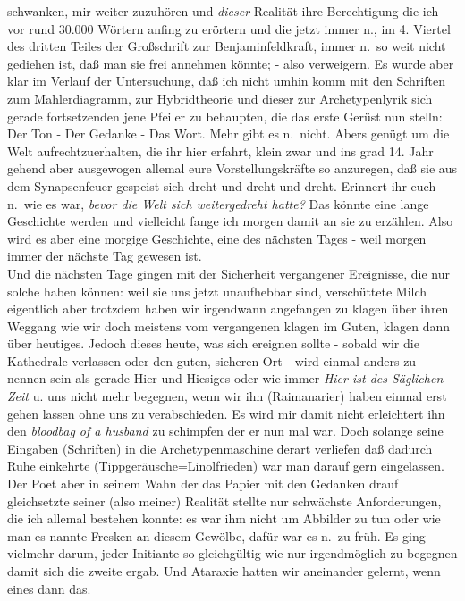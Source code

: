 \documentclass[
]{article}
\begin{document}
schwanken, mir weiter zuzuhören und \emph{dieser} Realität ihre
Berechtigung die ich vor rund 30.000 Wörtern anfing zu erörtern und die
jetzt immer n., im 4. Viertel des dritten Teiles der Großschrift zur
Benjaminfeldkraft, immer n.~so weit nicht gediehen ist, daß man sie frei
annehmen könnte; - also verweigern. Es wurde aber klar im Verlauf der
Untersuchung, daß ich nicht umhin komm mit den Schriften zum
Mahlerdiagramm, zur Hybridtheorie und dieser zur Archetypenlyrik sich
gerade fortsetzenden jene Pfeiler zu behaupten, die das erste Gerüst nun
stelln: Der Ton - Der Gedanke - Das Wort. Mehr gibt es n.~nicht. Abers
genügt um die Welt aufrechtzuerhalten, die ihr hier erfahrt, klein zwar
und ins grad 14. Jahr gehend aber ausgewogen allemal eure
Vorstellungskräfte so anzuregen, daß sie aus dem Synapsenfeuer gespeist
sich dreht und dreht und dreht. Erinnert ihr euch n.~wie es war,
\emph{bevor die Welt sich weitergedreht hatte?} Das könnte eine lange
Geschichte werden und vielleicht fange ich morgen damit an sie zu
erzählen. Also wird es aber eine morgige Geschichte, eine des nächsten
Tages - weil morgen immer der nächste Tag gewesen ist.\\
Und die nächsten Tage gingen mit der Sicherheit vergangener Ereignisse,
die nur solche haben können: weil sie uns jetzt unaufhebbar sind,
verschüttete Milch eigentlich aber trotzdem haben wir irgendwann
angefangen zu klagen über ihren Weggang wie wir doch meistens vom
vergangenen klagen im Guten, klagen dann über heutiges. Jedoch dieses
heute, was sich ereignen sollte - sobald wir die Kathedrale verlassen
oder den guten, sicheren Ort - wird einmal anders zu nennen sein als
gerade Hier und Hiesiges oder wie immer \emph{Hier ist des Säglichen
Zeit } u. uns nicht mehr begegnen, wenn wir ihn (Raimanarier) haben
einmal erst gehen lassen ohne uns zu verabschieden. Es wird mir damit
nicht erleichtert ihn den \emph{bloodbag of a husband} zu schimpfen der
er nun mal war. Doch solange seine Eingaben (Schriften) in die
Archetypenmaschine derart verliefen daß dadurch Ruhe einkehrte
(Tippgeräusche=Linolfrieden) war man darauf gern eingelassen. Der Poet
aber in seinem Wahn der das Papier mit den Gedanken drauf gleichsetzte
seiner (also meiner) Realität stellte nur schwächste Anforderungen, die
ich allemal bestehen konnte: es war ihm nicht um Abbilder zu tun oder
wie man es nannte Fresken an diesem Gewölbe, dafür war es n.~zu früh. Es
ging vielmehr darum, jeder Initiante so gleichgültig wie nur
irgendmöglich zu begegnen damit sich die zweite ergab. Und Ataraxie
hatten wir aneinander gelernt, wenn eines dann das.
\end{document}
